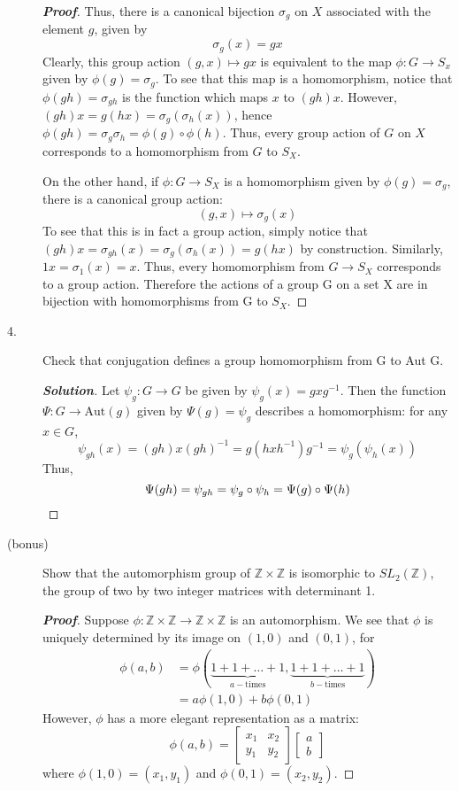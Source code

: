 \documentclass[12pt,leqno]{book}
\theoremstyle{definition}
\newcommand{\Z}{\mathbb{Z}}
\newenvironment{Proof}{\begin{proof}[\textnormal{\textbf{Proof}}]}{\end{proof}}
\newenvironment{Solution}{\begin{proof}[\textnormal{\textbf{Solution}}]}{\end{proof}}
\begin{document}
\begin{description}
\begin{Proof}
Thus, there is a canonical bijection $\sigma_g$ on $X$ associated with the element $g$, given by\[\sigma_g(x)=gx\] Clearly, this group action $(g,x)\mapsto gx$ is equivalent to the map $\phi:G\to S_x$ given by $\phi(g)=\sigma_g$. To see that this map is a homomorphism, notice that $\phi(gh)=\sigma_{gh}$ is the function which maps $x$ to $(gh)x$. However, $(gh)x=g(hx)=\sigma_g(\sigma_h(x))$, hence $\phi(gh)=\sigma_g\sigma_h=\phi(g)\circ\phi(h)$. Thus, every group action of $G$ on $X$ corresponds to a homomorphism from $G$ to $S_X$.

On the other hand, if $\phi:G\to S_X$ is a homomorphism given by $\phi(g)=\sigma_g$, there is a canonical group action: \[(g,x)\mapsto\sigma_g(x)\] To see that this is in fact a group action, simply notice that $(gh)x=\sigma_{gh}(x)=\sigma_g(\sigma_h(x))=g(hx)$ by construction. Similarly, $1x=\sigma_1(x)=x$. Thus, every homomorphism from $G\to S_X$ corresponds to a group action. Therefore the actions of a group G on a set X are in bijection with homomorphisms from G to $S_X$.
\end{Proof}


\item [4.] Check that conjugation defines a group homomorphism from G to Aut G.
\begin{Solution}
 Let $\psi_g:G\to G$ be given by $\psi_g(x)=gxg^{-1}$. Then the function $\Psi:G\to\text{Aut}(g)$ given by $\Psi(g)=\psi_g$ describes a homomorphism: for any $x\in G$, \[\psi_{gh}(x)=(gh)x(gh)^{-1}=g(hxh^{-1})g^{-1}=\psi_g(\psi_h(x))\] Thus, \[\Psi(gh)=\psi_{gh}=\psi_g\circ\psi_h=\Psi(g)\circ\Psi(h)\qedhere\]
\end{Solution}

\item [(bonus)] Show that the automorphism group of $\mathbb{Z}\times\mathbb{Z}$ is isomorphic to $SL_2(\mathbb{Z})$, the group of two by two integer matrices with determinant 1.
\begin{Proof}
Suppose $\phi:\Z\times\Z\to\Z\times\Z$ is an automorphism. We see that $\phi$ is uniquely determined by its image on $(1,0)$ and $(0,1)$, for \begin{align*}\phi(a,b)&=\phi\left(\underbrace{1+1+\hdots+1}_{a-\text{times}},\underbrace{1+1+\hdots+1}_{b-\text{times}}\right)\\&=a\phi(1,0)+b\phi(0,1)\end{align*} However, $\phi$ has a more elegant representation as a matrix:\[\phi(a,b)=\begin{bmatrix}x_1&x_2\\y_1&y_2\end{bmatrix}\begin{bmatrix}a\\b\end{bmatrix}\] where $\phi(1,0)=(x_1,y_1)$ and $\phi(0,1)=(x_2,y_2)$.


\end{Proof}
\end{description}
\end{document}
